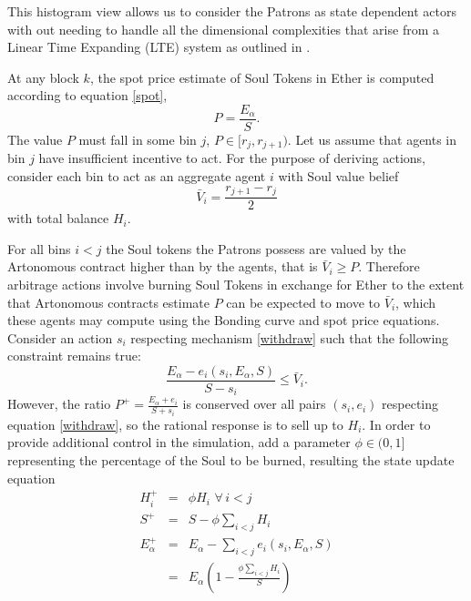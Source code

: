 \documentclass[11pt]{amsart}
\begin{document}
This histogram view allows us to consider the Patrons as state dependent actors with out needing to handle all the dimensional complexities that arise from a Linear Time Expanding (LTE) system as outlined in \cite{MZICCS18}. 

At any block $k$, the spot price estimate of Soul Tokens in Ether is computed according to equation \eqref{spot},
\begin{equation}
P = \frac{E_\alpha}{S}.
\end{equation}
The value $P$ must fall in some bin $j$, $P\in[r_j, r_{j+1})$. Let us assume that agents in bin $j$ have insufficient incentive to act.  For the purpose of deriving actions, consider each bin to act as an aggregate agent $i$ with Soul value belief
\begin{equation}
\bar V_i = \frac{r_{j+1}-r_j}{2}
\end{equation}
with total balance $H_i$.

For all bins $i<j$ the Soul tokens the Patrons possess are valued by the Artonomous contract higher than by the agents, that is $\bar V_i \ge P$. Therefore arbitrage actions involve burning Soul Tokens in exchange for Ether to the extent that Artonomous contracts estimate $P$ can be expected to move to $\bar V_i$, which these agents may compute using the Bonding curve and spot price equations. Consider an action $s_i$ respecting mechanism \eqref{withdraw} such that the following constraint remains true:
\begin{equation}
\frac{E_\alpha -e_i(s_i,E_\alpha, S)}{S-s_i} \le \bar V_i.
\end{equation}
However, the ratio $P^+=\frac{E_\alpha+e_i}{S+s_i}$ is conserved over all pairs $(s_i,e_i)$ respecting equation \eqref{withdraw}, so the rational response is to sell up to $H_i$. In order to provide additional control in the simulation, add a parameter $\phi \in (0,1]$ representing the percentage of the Soul to be burned, resulting the state update equation
\begin{eqnarray}
H_i^+ &=& \phi H_i \,\,\forall \,i<j\\
S^+ &=& S - \phi \sum_{i<j} H_i \\
E_\alpha^+ &=& E_\alpha - \sum_{i<j} e_i(s_i, E_\alpha, S)\\
&=&E_\alpha \left(1- \frac{\phi \sum_{i<j} H_i}{S} \right)
\end{eqnarray}
\end{document}
